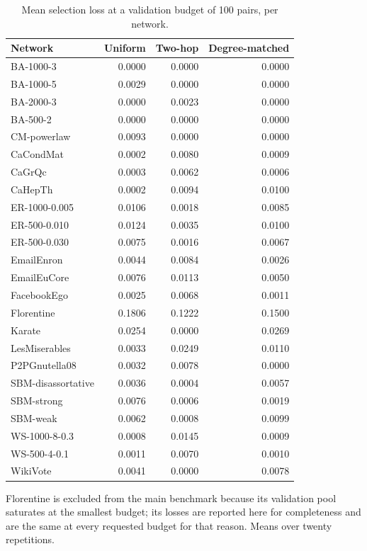 \begin{table}[htbp]
\centering
\footnotesize
\caption{Mean selection loss at a validation budget of 100 pairs, per network.}
\label{tab:pergraph}
\begin{tabular}{l r r r}
\toprule
Network & Uniform & Two-hop & Degree-matched \\
\midrule
BA-1000-3 & 0.0000 & 0.0000 & 0.0000 \\
BA-1000-5 & 0.0029 & 0.0000 & 0.0000 \\
BA-2000-3 & 0.0000 & 0.0023 & 0.0000 \\
BA-500-2 & 0.0000 & 0.0000 & 0.0000 \\
CM-powerlaw & 0.0093 & 0.0000 & 0.0000 \\
CaCondMat & 0.0002 & 0.0080 & 0.0009 \\
CaGrQc & 0.0003 & 0.0062 & 0.0006 \\
CaHepTh & 0.0002 & 0.0094 & 0.0100 \\
ER-1000-0.005 & 0.0106 & 0.0018 & 0.0085 \\
ER-500-0.010 & 0.0124 & 0.0035 & 0.0100 \\
ER-500-0.030 & 0.0075 & 0.0016 & 0.0067 \\
EmailEnron & 0.0044 & 0.0084 & 0.0026 \\
EmailEuCore & 0.0076 & 0.0113 & 0.0050 \\
FacebookEgo & 0.0025 & 0.0068 & 0.0011 \\
Florentine & 0.1806 & 0.1222 & 0.1500 \\
Karate & 0.0254 & 0.0000 & 0.0269 \\
LesMiserables & 0.0033 & 0.0249 & 0.0110 \\
P2PGnutella08 & 0.0032 & 0.0078 & 0.0000 \\
SBM-disassortative & 0.0036 & 0.0004 & 0.0057 \\
SBM-strong & 0.0076 & 0.0006 & 0.0019 \\
SBM-weak & 0.0062 & 0.0008 & 0.0099 \\
WS-1000-8-0.3 & 0.0008 & 0.0145 & 0.0009 \\
WS-500-4-0.1 & 0.0011 & 0.0070 & 0.0010 \\
WikiVote & 0.0041 & 0.0000 & 0.0078 \\
\bottomrule
\end{tabular}
\par\vspace{2pt}\begin{minipage}{\linewidth}\footnotesize Florentine is excluded from the main benchmark because its validation pool saturates at the smallest budget; its losses are reported here for completeness and are the same at every requested budget for that reason. Means over twenty repetitions.\end{minipage}
\end{table}
